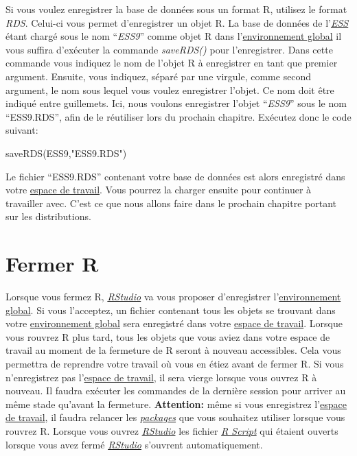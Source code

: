 \documentclass[
]{book}
\newenvironment{Shaded}{\begin{snugshade}}{\end{snugshade}}
\newcommand{\FunctionTok}[1]{\textcolor[rgb]{0.00,0.00,0.00}{#1}}
\newcommand{\NormalTok}[1]{#1}
\newcommand{\StringTok}[1]{\textcolor[rgb]{0.31,0.60,0.02}{#1}}
\begin{document}
Si vous voulez enregistrer la base de données sous un format R, utilisez le format \emph{RDS}. Celui-ci vous permet d'enregistrer un objet R. La base de données de l'\href{https://www.europeansocialsurvey.org/}{\emph{ESS}} étant chargé sous le nom ``\emph{ESS9}'' comme objet R dans l'\protect\hyperlink{objets_envir}{environnement global} il vous suffira d'exécuter la commande \emph{saveRDS()} pour l'enregistrer. Dans cette commande vous indiquez le nom de l'objet R à enregistrer en tant que premier argument. Ensuite, vous indiquez, séparé par une virgule, comme second argument, le nom sous lequel vous voulez enregistrer l'objet. Ce nom doit être indiqué entre guillemets. Ici, nous voulons enregistrer l'objet ``\emph{ESS9}'' sous le nom ``ESS9.RDS'', afin de le réutiliser lors du prochain chapitre. Exécutez donc le code suivant:

\begin{Shaded}
\begin{Highlighting}[]
\FunctionTok{saveRDS}\NormalTok{(ESS9,}\StringTok{"ESS9.RDS"}\NormalTok{)}
\end{Highlighting}
\end{Shaded}

Le fichier ``ESS9.RDS'' contenant votre base de données est alors enregistré dans votre \protect\hyperlink{working_directory}{espace de travail}. Vous pourrez la charger ensuite pour continuer à travailler avec. C'est ce que nous allons faire dans le prochain chapitre portant sur les distributions.

\hypertarget{close_R}{%
\section{Fermer R}\label{close_R}}

Lorsque vous fermez R, \href{https://posit.co/}{\emph{RStudio}} va vous proposer d'enregistrer l'\protect\hyperlink{objets_envir}{environnement global}. Si vous l'acceptez, un fichier contenant tous les objets se trouvant dans votre \protect\hyperlink{objets_envir}{environnement global} sera enregistré dans votre \protect\hyperlink{working_directory}{espace de travail}. Lorsque vous rouvrez R plus tard, tous les objets que vous aviez dans votre espace de travail au moment de la fermeture de R seront à nouveau accessibles. Cela vous permettra de reprendre votre travail où vous en étiez avant de fermer R. Si vous n'enregistrez pas l'\protect\hyperlink{working_directory}{espace de travail}, il sera vierge lorsque vous ouvrez R à nouveau. Il faudra exécuter les commandes de la dernière session pour arriver au même stade qu'avant la fermeture. \textbf{Attention:} même si vous enregistrez l'\protect\hyperlink{working_directory}{espace de travail}, il faudra relancer les \protect\hyperlink{packages}{\emph{packages}} que vous souhaitez utiliser lorsque vous rouvrez R. Lorsque vous ouvrez \href{https://posit.co/}{\emph{RStudio}} les fichier \protect\hyperlink{Commandes}{\emph{R Script}} qui étaient ouverts lorsque vous avez fermé \href{https://posit.co/}{\emph{RStudio}} s'ouvrent automatiquement.
\end{document}
